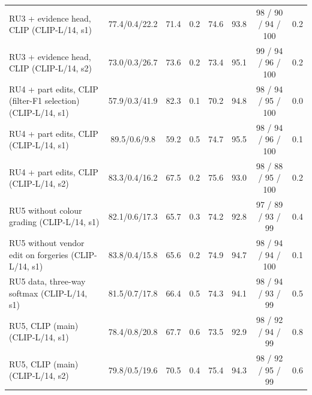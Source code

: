 \begin{tabular}{l c cc c c c c}
RU3 + evidence head, CLIP (CLIP-L/14, s1) & 77.4/0.4/22.2 & 71.4 & 0.2 & 74.6 & 93.8 & 98 / 90 / 94 / 100 & 0.2 \\
RU3 + evidence head, CLIP (CLIP-L/14, s2) & 73.0/0.3/26.7 & 73.6 & 0.2 & 73.4 & 95.1 & 99 / 94 / 96 / 100 & 0.2 \\
RU4 + part edits, CLIP (filter-F1 selection) (CLIP-L/14, s1) & 57.9/0.3/41.9 & 82.3 & 0.1 & 70.2 & 94.8 & 98 / 94 / 95 / 100 & 0.0 \\
RU4 + part edits, CLIP (CLIP-L/14, s1) & 89.5/0.6/9.8 & 59.2 & 0.5 & 74.7 & 95.5 & 98 / 94 / 96 / 100 & 0.1 \\
RU4 + part edits, CLIP (CLIP-L/14, s2) & 83.3/0.4/16.2 & 67.5 & 0.2 & 75.6 & 93.0 & 98 / 88 / 95 / 100 & 0.2 \\
RU5 without colour grading (CLIP-L/14, s1) & 82.1/0.6/17.3 & 65.7 & 0.3 & 74.2 & 92.8 & 97 / 89 / 93 / 99 & 0.4 \\
RU5 without vendor edit on forgeries (CLIP-L/14, s1) & 83.8/0.4/15.8 & 65.6 & 0.2 & 74.9 & 94.7 & 98 / 94 / 94 / 100 & 0.1 \\
RU5 data, three-way softmax (CLIP-L/14, s1) & 81.5/0.7/17.8 & 66.4 & 0.5 & 74.3 & 94.1 & 98 / 94 / 93 / 99 & 0.5 \\
RU5, CLIP (main) (CLIP-L/14, s1) & 78.4/0.8/20.8 & 67.7 & 0.6 & 73.5 & 92.9 & 98 / 92 / 94 / 99 & 0.8 \\
RU5, CLIP (main) (CLIP-L/14, s2) & 79.8/0.5/19.6 & 70.5 & 0.4 & 75.4 & 94.3 & 98 / 92 / 95 / 99 & 0.6 \\
\bottomrule
\end{tabular}
